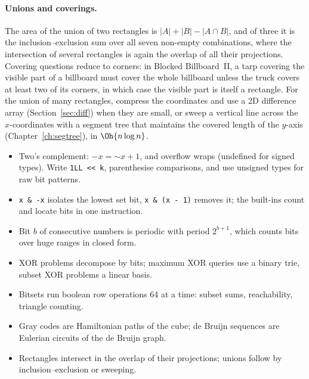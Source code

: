 
\paragraph{Unions and coverings.} The area of the union of two rectangles is $|A| + |B| - |A \cap B|$, and of three it is the
inclusion--exclusion sum over all seven non-empty combinations, where the intersection of several rectangles is again the
overlap of all their projections. Covering questions reduce to corners: in Blocked Billboard~II, a tarp covering the visible
part of a billboard must cover the whole billboard unless the truck covers at least two of its corners, in which case the
visible part is itself a rectangle. For the union of many rectangles, compress the coordinates and use a 2D difference array
(Section~\ref{sec:diff}) when they are small, or sweep a vertical line across the $x$-coordinates with a segment tree that
maintains the covered length of the $y$-axis (Chapter~\ref{ch:segtree}), in $\Oh{n \log n}$.

\begin{summary}
\begin{itemize}
  \item Two's complement: $-x = \mathord{\sim}x + 1$, and overflow wraps (undefined for signed types). Write
        \texttt{1LL <{}< k}, parenthesise comparisons, and use unsigned types for raw bit patterns.
  \item \texttt{x \& -x} isolates the lowest set bit, \texttt{x \& (x - 1)} removes it; the built-ins count and locate bits in
        one instruction.
  \item Bit $b$ of consecutive numbers is periodic with period $2^{b+1}$, which counts bits over huge ranges in closed form.
  \item XOR problems decompose by bits; maximum XOR queries use a binary trie, subset XOR problems a linear basis.
  \item Bitsets run boolean row operations 64 at a time: subset sums, reachability, triangle counting.
  \item Gray codes are Hamiltonian paths of the cube; de Bruijn sequences are Eulerian circuits of the de Bruijn graph.
  \item Rectangles intersect in the overlap of their projections; unions follow by inclusion--exclusion or sweeping.
\end{itemize}
\end{summary}

